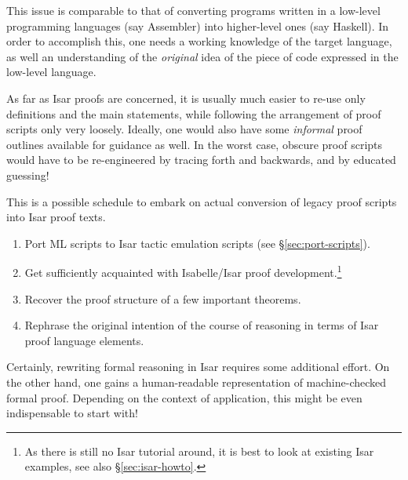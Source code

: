 This issue is comparable to that of converting programs written in a low-level
programming languages (say Assembler) into higher-level ones (say Haskell).
In order to accomplish this, one needs a working knowledge of the target
language, as well an understanding of the \emph{original} idea of the piece of
code expressed in the low-level language.

As far as Isar proofs are concerned, it is usually much easier to re-use only
definitions and the main statements, while following the arrangement of proof
scripts only very loosely.  Ideally, one would also have some \emph{informal}
proof outlines available for guidance as well.  In the worst case, obscure
proof scripts would have to be re-engineered by tracing forth and backwards,
and by educated guessing!

\medskip This is a possible schedule to embark on actual conversion of legacy
proof scripts into Isar proof texts.

\begin{enumerate}

\item Port ML scripts to Isar tactic emulation scripts (see
  \S\ref{sec:port-scripts}).

\item Get sufficiently acquainted with Isabelle/Isar proof
  development.\footnote{As there is still no Isar tutorial around, it is best
    to look at existing Isar examples, see also \S\ref{sec:isar-howto}.}

\item Recover the proof structure of a few important theorems.

\item Rephrase the original intention of the course of reasoning in terms of
  Isar proof language elements.

\end{enumerate}

Certainly, rewriting formal reasoning in Isar requires some additional effort.
On the other hand, one gains a human-readable representation of
machine-checked formal proof.  Depending on the context of application, this
might be even indispensable to start with!


